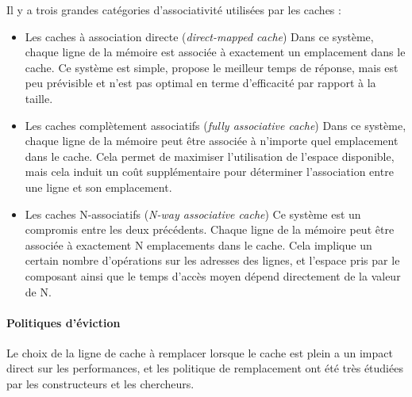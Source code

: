 Il y a trois grandes catégories d'associativité utilisées par les caches :
\begin{itemize}
  \item Les caches à association directe (\emph{direct-mapped cache})
    Dans ce système, chaque ligne de la mémoire est associée à exactement un emplacement dans le cache.
    Ce système est simple, propose le meilleur temps de réponse, mais est peu prévisible et n'est pas optimal en terme d'efficacité par rapport à la taille.
  \item Les caches complètement associatifs (\emph{fully associative cache})
    Dans ce système, chaque ligne de la mémoire peut être associée à n'importe quel emplacement dans le cache.
    Cela permet de maximiser l'utilisation de l'espace disponible, mais cela induit un coût supplémentaire pour déterminer l'association entre une ligne et son emplacement.
  \item Les caches N-associatifs (\emph{N-way associative cache})
    Ce système est un compromis entre les deux précédents.
    Chaque ligne de la mémoire peut être associée à exactement N emplacements dans le cache.
    Cela implique un certain nombre d'opérations sur les adresses des lignes, et l'espace pris par le composant ainsi que le temps d'accès moyen dépend directement de la valeur de N.
\end{itemize}

\paragraph{Politiques d'éviction}

Le choix de la ligne de cache à remplacer lorsque le cache est plein a un impact direct sur les performances, et les politique de remplacement ont été très étudiées par les constructeurs et les chercheurs.

